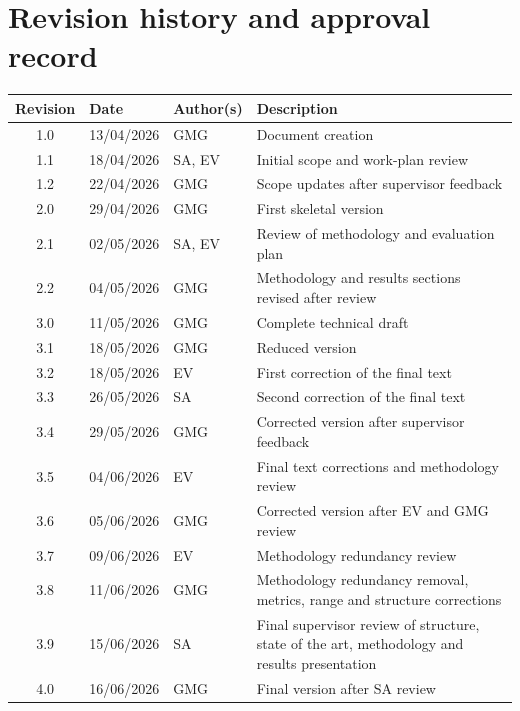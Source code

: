\vspace*{0cm}

\chapter*{Revision history and approval record}
{}
  
\begin{tabularx}{\textwidth}{|c|l|l|X|}
  \hline
  \textbf{Revision} & \textbf{Date} & \textbf{Author(s)} & \textbf{Description} \\
  \hline
  1.0 & 13/04/2026 & GMG & Document creation \\
  \hline
  1.1 & 18/04/2026 & SA, EV & Initial scope and work-plan review \\
  \hline
  1.2 & 22/04/2026 & GMG & Scope updates after supervisor feedback \\
  \hline
  2.0 & 29/04/2026 & GMG & First skeletal version \\
  \hline
  2.1 & 02/05/2026 & SA, EV & Review of methodology and evaluation plan \\
  \hline
  2.2 & 04/05/2026 & GMG & Methodology and results sections revised after review \\
  \hline
  3.0 & 11/05/2026 & GMG & Complete technical draft \\
  \hline
  3.1 & 18/05/2026 & GMG & Reduced version \\
  \hline
  3.2 & 18/05/2026 & EV & First correction of the final text \\
  \hline
  3.3 & 26/05/2026 & SA & Second correction of the final text \\
  \hline
  3.4 & 29/05/2026 & GMG & Corrected version after supervisor feedback \\
  \hline
  3.5 & 04/06/2026 & EV & Final text corrections and methodology review \\
  \hline
  3.6 & 05/06/2026 & GMG & Corrected version after EV and GMG review \\
  \hline
  3.7 & 09/06/2026 & EV & Methodology redundancy review \\
  \hline
  3.8 & 11/06/2026 & GMG & Methodology redundancy removal, metrics, range and structure corrections \\
  \hline
  3.9 & 15/06/2026 & SA & Final supervisor review of structure, state of the art, methodology and results presentation \\
  \hline
  4.0 & 16/06/2026 & GMG & Final version after SA review \\
  \hline
\end{tabularx}

